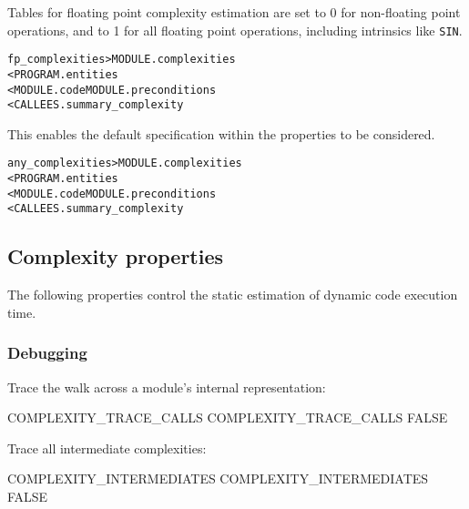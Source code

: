 \documentclass[a4paper]{report}
\newenvironment{PipsMake}{\begin{alltt}}{\end{alltt}}
\newenvironment{PipsPass}[1]{\label{pass:#1}}{}
\begin{document}
\begin{PipsPass}{fp_complexities}
Tables for floating point complexity estimation are set to 0 for
non-floating point operations, and to 1 for all floating point
operations, including intrinsics like \texttt{SIN}.
\end{PipsPass}

\begin{PipsMake}
fp_complexities                    > MODULE.complexities
        < PROGRAM.entities
        < MODULE.code MODULE.preconditions
        < CALLEES.summary_complexity
\end{PipsMake}

\begin{PipsPass}{any_complexities}
This enables the default specification within the properties to
be considered.
\end{PipsPass}

\begin{PipsMake}
any_complexities                    > MODULE.complexities
        < PROGRAM.entities
        < MODULE.code MODULE.preconditions
        < CALLEES.summary_complexity
\end{PipsMake}

\subsection{Complexity properties}


The following properties control the static estimation of dynamic code
execution time.

\subsubsection{Debugging}

Trace the walk across a module's internal representation:

\begin{PipsProp}{COMPLEXITY_TRACE_CALLS}
COMPLEXITY_TRACE_CALLS FALSE
\end{PipsProp}

Trace all intermediate complexities:

\begin{PipsProp}{COMPLEXITY_INTERMEDIATES}
COMPLEXITY_INTERMEDIATES FALSE
\end{PipsProp}
\end{document}
